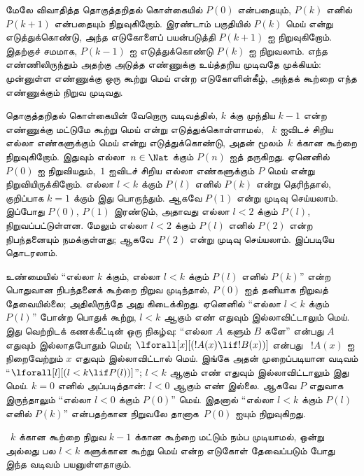 \documentclass[../../../include/open-logic-section]{subfiles}
\begin{document}


மேலே விவாதித்த தொகுத்தறிதல் கொள்கையில் $P(0)$
என்பதையும், $P(k)$ எனில் $P(k+1)$ என்பதையும்
நிறுவுகிறோம். இரண்டாம் பகுதியில் $P(k)$ மெய்
என்று எடுத்துக்கொண்டு, அந்த எடுகோளைப் பயன்படுத்தி
$P(k+1)$ ஐ நிறுவுகிறோம். இதற்குச் சமமாக,
$P(k-1)$ ஐ எடுத்துக்கொண்டு $P(k)$ ஐ
நிறுவலாம். எந்த எண்ணிலிருந்தும் அதற்கு அடுத்த
எண்ணுக்கு உய்த்தறிய முடிவதே முக்கியம்: முன்னுள்ள
எண்ணுக்கு ஒரு கூற்று மெய் என்ற எடுகோளின்கீழ்,
அந்தக் கூற்றை எந்த எண்ணுக்கும் நிறுவ முடிவது.

தொகுத்தறிதல் கொள்கையின் வேறொரு வடிவத்தில்,
$k$ க்கு முந்திய $k-1$ என்ற எண்ணுக்கு மட்டுமே
கூற்று மெய் என்று எடுத்துக்கொள்ளாமல்,
~$k$ ஐவிடச் சிறிய எல்லா எண்களுக்கும் மெய்
என்று எடுத்துக்கொண்டு, அதன் மூலம்~$k$ க்கான
கூற்றை நிறுவுகிறோம். இதுவும் எல்லா~$n \in \Nat$
க்கும் $P(n)$ ஐத் தருகிறது. ஏனெனில் $P(0)$
ஐ நிறுவியதும்,~$1$ ஐவிடச் சிறிய எல்லா
எண்களுக்கும் $P$ மெய் என்று நிறுவியிருக்கிறோம்.
எல்லா $l<k$ க்கும் $P(l)$ எனில் $P(k)$
என்று தெரிந்தால், குறிப்பாக $k=1$ க்கும்
இது பொருந்தும். ஆகவே $P(1)$ என்று முடிவு
செய்யலாம். இப்போது $P(0)$, $P(1)$ இரண்டும்,
அதாவது எல்லா $l<2$ க்கும் $P(l)$,
நிறுவப்பட்டுள்ளன. மேலும் எல்லா $l<2$ க்கும்
$P(l)$ எனில் $P(2)$ என்ற நிபந்தனையும்
நமக்குள்ளது; ஆகவே~$P(2)$ என்று முடிவு
செய்யலாம். இப்படியே தொடரலாம்.

உண்மையில் ``எல்லா $k$ க்கும், எல்லா $l<k$
க்கும் $P(l)$ எனில் $P(k)$'' என்ற பொதுவான
நிபந்தனைக் கூற்றை நிறுவ முடிந்தால், $P(0)$
ஐத் தனியாக நிறுவத் தேவையில்லை; அதிலிருந்தே
அது கிடைக்கிறது. ஏனெனில் ``எல்லா $l<k$
க்கும் $P(l)$'' போன்ற பொதுக் கூற்று,
$l<k$ ஆகும் எண் எதுவும் இல்லாவிட்டாலும்
மெய். இது வெற்றிடக் கணக்கீட்டின் ஒரு நிகழ்வு:
``எல்லா $A$ களும் $B$ களே'' என்பது
$A$ எதுவும் இல்லாதபோதும் மெய்;
$\lforall[x][(!A(x) \lif !B(x))]$ என்பது
~$!A(x)$ ஐ நிறைவேற்றும் $x$ எதுவும்
இல்லாவிட்டால் மெய். இங்கே அதன் முறைப்படியான
வடிவம் ``$\lforall[l][(l < k \lif P(l))]$'';
$l < k$ ஆகும் எண் எதுவும் இல்லாவிட்டாலும்
இது மெய். $k=0$ எனில் அப்படித்தான்:
$l<0$ ஆகும் எண் இல்லை. ஆகவே $P$ எதுவாக
இருந்தாலும் ``எல்லா $l<0$ க்கும் $P(0)$''
மெய். இதனால் ``எல்லா $l<k$ க்கும்
$P(l)$ எனில் $P(k)$'' என்பதற்கான நிறுவலே
தானாக~$P(0)$ ஐயும் நிறுவுகிறது.

~$k$ க்கான கூற்றை நிறுவ $k-1$ க்கான
கூற்றை மட்டும் நம்ப முடியாமல், ஒன்று அல்லது
பல $l<k$ களுக்கான கூற்று மெய் என்ற
எடுகோள் தேவைப்படும் போது இந்த வடிவம்
பயனுள்ளதாகும்.
\end{document}

